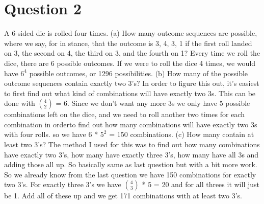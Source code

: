 \documentclass[12pt]{report}
\begin{document}
\section{Question 2}
A 6-sided die is rolled four times.
\newline
\newline
(a) How many outcome sequences are possible, where we say, for in stance, that the outcome is 3, 4, 3, 1 if the first roll landed on 3, the second on 4, the
third on 3, and the fourth on 1?
\newline
Every time we roll the dice, there are 6 possible outcomes. If we were to roll the dice 4 times, we would have $6^4$ possible outcomes, or 1296 possibilities. 
\newline
\newline
(b) How many of the possible outcome sequences contain exactly two 3's?
\newline
In order to figure this out, it's easiest to first find out what kind of combinations will have exactly two 3s. This can be done with ${4 \choose 2}$ = 6. Since we don't want any more 3s we only have 5 possible combinations left on the dice, and we need to roll another two times for each combination in orderto find out how many combinations will have exactly two 3s with four rolls. so we have 6 * $5^2$ = 150 combinations. 
\newline
\newline
(c) How many contain at least two 3's?
\newline
The method I used for this was to find out how many combinations have exactly two 3's, how many have exactly three 3's, how many have all 3s and adding those all up. So basically same as last question but with a bit more work. So we already know from the last question we have 150 combinations for exactly two 3's. For exactly three 3's we have ${4 \choose 3}$ * 5 = 20 and for all threes it will just be 1. Add all of these up and we get 171 combinations with at least two 3's.
\end{document}
